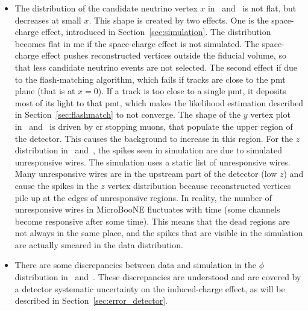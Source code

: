 \begin{itemize}
\item The distribution of the candidate neutrino vertex $x$ in~ and~ is not flat, but decreases at small $x$. This shape is created by two effects. One is the space-charge effect, introduced in Section~\ref{sec:simulation}. The distribution becomes flat in \acrshort{mc} if the space-charge effect is not simulated. The space-charge effect pushes reconstructed vertices outside the fiducial volume, so that less candidate neutrino events are not selected. The second effect if due to the flash-matching algorithm, which fails if tracks are close to the \acrshort{pmt} plane (that is at $x=0$). If a track is too close to a single \acrshort{pmt}, it deposits most of its light to that \acrshort{pmt}, which makes the likelihood estimation described in Section~\ref{sec:flashmatch} to not converge.
The shape of the $y$ vertex plot in~ and~ is driven by \acrshort{cr} stopping muons, that populate the upper region of the detector. This causes the background to increase in this region. For the $z$ distribution in~ and~, the spikes seen in simulation are due to simulated unresponsive wires. 
The simulation uses a static list of unresponsive wires. Many unresponsive wires are in the upstream part of the detector (low $z$) and cause the spikes in the $z$ vertex distribution because reconstructed vertices pile up at the edges of unresponsive regions. In reality, the number of unresponsive wires in MicroBooNE fluctuates with time (some channels become responsive after some time). This means that the dead regions are not always in the same place, and the spikes that are visible in the simulation are actually smeared in the data distribution. 
\item There are some discrepancies between data and simulation in the $\phi$ distribution in~ and~. These discrepancies are understood and are covered by a detector systematic uncertainty on the induced-charge effect, as will be described in Section~\ref{sec:error_detector}.
\end{itemize}




